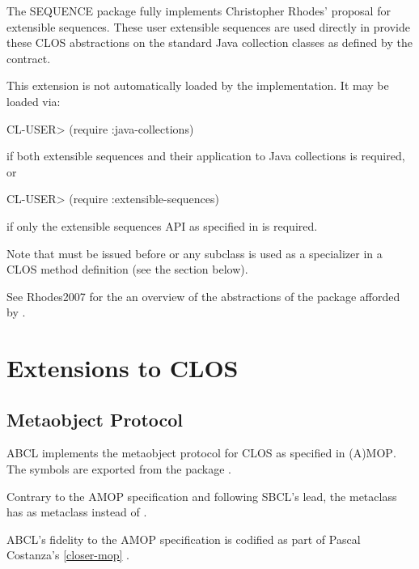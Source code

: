 \documentclass[10pt]{book}
\begin{document}
The SEQUENCE package fully implements Christopher Rhodes' proposal for
extensible sequences.  These user extensible sequences are used
directly in  provide these CLOS
abstractions on the standard Java collection classes as defined by the
 contract.


This extension is not automatically loaded by the implementation.   It
may be loaded via:

\begin{listing-lisp}
CL-USER> (require :java-collections)
\end{listing-lisp}

if both extensible sequences and their application to Java collections
is required, or

\begin{listing-lisp}
CL-USER> (require :extensible-sequences)
\end{listing-lisp}

if only the extensible sequences API as specified in \cite{RHODES2007} is
required.

Note that  must be issued before
 or any subclass is used as a specializer in a \textsc{CLOS}
method definition (see the section below).

See Rhodes2007 \cite{RHODES2007} for the an overview of the
abstractions of the  package afforded by
.

\section{Extensions to CLOS}

\subsection{Metaobject Protocol}

\textsc{ABCL} implements the metaobject protocol for \textsc{CLOS} as
specified in \textsc{(A)MOP}.  The symbols are exported from the
package .

Contrary to the AMOP specification and following \textsc{SBCL}'s lead,
the metaclass  has
 as metaclass instead of
.

\textsc{ABCL}'s fidelity to the AMOP specification is codified as part
of Pascal Costanza's  \ref{closer-mop} \cite{closer-mop}.
\end{document}
